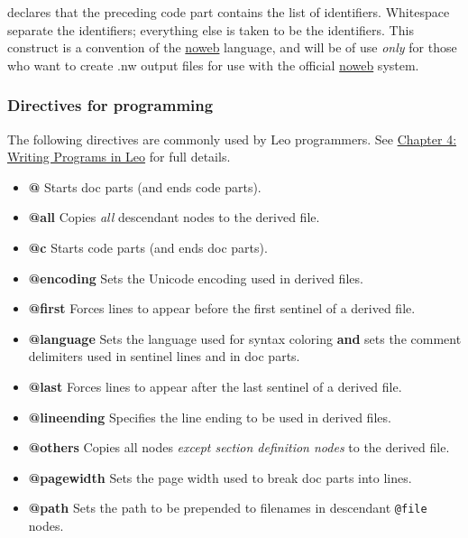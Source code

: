 \documentclass[10pt,a4paper,english]{article}
\begin{document}
declares that the preceding code part contains the list of identifiers.
Whitespace separate the identifiers; everything else is taken to be the
identifiers. This construct is a convention of the \href{http://www.eecs.harvard.edu/~nr/noweb/}{noweb} language, and will be
of use \emph{only} for those who want to create .nw output files for use with the
official \href{http://www.eecs.harvard.edu/~nr/noweb/}{noweb} system.



\hypertarget{directives-for-programming}{}
\subsubsection*{Directives for programming}

The following directives are commonly used by Leo programmers.
See \href{directives.html}{Chapter 4: Writing Programs in Leo} for full details.
\begin{itemize}
\item {} 
\textbf{@} Starts doc parts (and ends code parts).

\item {} 
\textbf{@all} Copies \emph{all} descendant nodes to the derived file.

\item {} 
\textbf{@c} Starts code parts (and ends doc parts).

\item {} 
\textbf{@encoding} Sets the Unicode encoding used in derived files.

\item {} 
\textbf{@first} Forces lines to appear before the first sentinel of a derived file.

\item {} 
\textbf{@language} Sets the language used for syntax coloring \textbf{and} sets the comment delimiters
used in sentinel lines and in doc parts.

\item {} 
\textbf{@last} Forces lines to appear after the last sentinel of a derived file.

\item {} 
\textbf{@lineending} Specifies the line ending to be used in derived files.

\item {} 
\textbf{@others} Copies all nodes \emph{except section definition nodes} to the derived file.

\item {} 
\textbf{@pagewidth} Sets the page width used to break doc parts into lines.

\item {} 
\textbf{@path} Sets the path to be prepended to filenames in descendant \texttt{@file} nodes.

\end{itemize}
\end{document}
